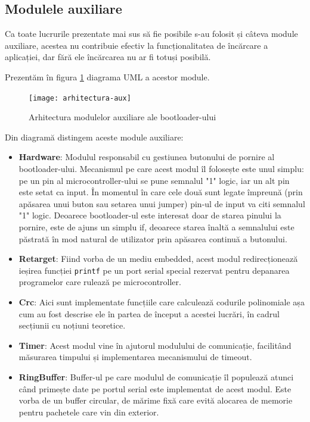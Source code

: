 \documentclass[12pt,a4paper,titlepage]{report}
\begin{document}
\subsection{Modulele auxiliare}

Ca toate lucrurile prezentate mai sus să fie posibile s-au folosit și câteva module auxiliare, acestea nu contribuie efectiv la funcționalitatea de încărcare a aplicației, dar fără ele încărcarea nu ar fi totuși posibilă.

Prezentăm în figura \ref{arhitectura-aux} diagrama UML a acestor module.

\begin{figure}[h]
    \centering
    \texttt{[image: arhitectura-aux]}
    \caption{Arhitectura modulelor auxiliare ale bootloader-ului}
    \label{arhitectura-aux}
\end{figure}

Din diagramă distingem aceste module auxiliare:
\begin{itemize}
\item \textbf{Hardware}: Modulul responsabil cu gestiunea butonului de pornire al bootloader-ului. Mecanismul pe care acest modul îl folosește este unul simplu: pe un pin al microcontroller-ului se pune semnalul "1" logic, iar un alt pin este setat ca input. În momentul în care cele două sunt legate împreună (prin apăsarea unui buton sau setarea unui jumper) pin-ul de input va citi semnalul "1" logic. Deoarece bootloader-ul este interesat doar de starea pinului la pornire, este de ajuns un simplu if, deoarece starea înaltă a semnalului este păstrată în mod natural de utilizator prin apăsarea continuă a butonului.
\item \textbf{Retarget}: Fiind vorba de un mediu embedded, acest modul redirecționează ieșirea funcției \texttt{printf} pe un port serial special rezervat pentru depanarea programelor care rulează pe microcontroller.
\item \textbf{Crc}: Aici sunt implementate funcțiile care calculează codurile polinomiale așa cum au fost descrise ele în partea de început a acestei lucrări, în cadrul secțiunii cu noțiuni teoretice.
\item \textbf{Timer}: Acest modul vine în ajutorul modulului de comunicație, facilitând măsurarea timpului și implementarea mecanismului de timeout.
\item \textbf{RingBuffer}: Buffer-ul pe care modulul de comunicație îl populează atunci când primește date pe portul serial este implementat de acest modul. Este vorba de un buffer circular, de mărime fixă care evită alocarea de memorie pentru pachetele care vin din exterior.
\end{itemize}
\end{document}
